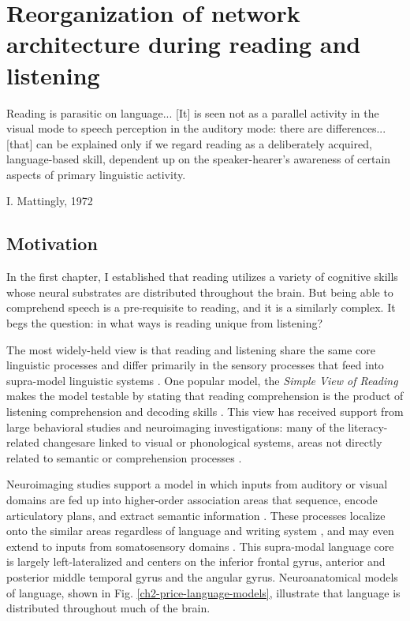 \chapter{Reorganization of network architecture during reading and listening}

\epigraph{Reading is parasitic on language... [It] is seen not as a parallel activity in the visual mode to speech perception in the auditory mode: there are differences... [that] can be explained only if we regard reading as a deliberately acquired, language-based skill, dependent up on the speaker-hearer's awareness of certain aspects of primary linguistic activity.}{I. Mattingly, 1972 \cite{Mattingly1972}}

\section{Motivation}

In the first chapter, I established that reading utilizes a variety of cognitive skills whose neural substrates are distributed throughout the brain. But being able to comprehend speech is a pre-requisite to reading, and it is a similarly complex. It begs the question: in what ways is reading unique from listening?

The most widely-held view is that reading and listening share the same core linguistic processes and differ primarily in the sensory processes that feed into supra-model linguistic systems \cite{Mattingly1972, Price2012}. One popular model, the \textit{Simple View of Reading} makes the model testable by stating that reading comprehension is the product of listening comprehension and decoding skills \cite{Gough1988}. This view has received support from large behavioral studies \cite{...} and neuroimaging investigations: many of the literacy-related changesare linked to visual or phonological systems, areas not directly related to semantic or comprehension processes \cite{Schlaggar2006, Dahaene2015}. 

Neuroimaging studies support a model in which inputs from auditory or visual domains are fed up into higher-order association areas that sequence, encode articulatory plans, and extract semantic information \cite{Price2012}. These processes localize onto the similar areas regardless of language and writing system \cite{Rueckl2016}, and may even extend to inputs from somatosensory domains \cite{Xu2005, Sood2015}. This supra-modal language core is largely left-lateralized and centers on the inferior frontal gyrus, anterior and posterior middle temporal gyrus and the angular gyrus. Neuroanatomical models of language, shown in Fig. \ref{ch2-price-language-models}, illustrate that language is distributed throughout much of the brain. 

